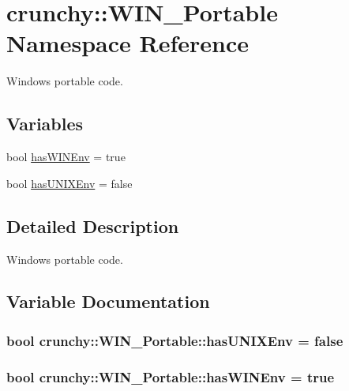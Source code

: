 \hypertarget{namespacecrunchy_1_1_w_i_n___portable}{}\section{crunchy\+:\+:W\+I\+N\+\_\+\+Portable Namespace Reference}
\label{namespacecrunchy_1_1_w_i_n___portable}


Windows portable code.  


\subsection*{Variables}
\begin{DoxyCompactItemize}
\item 
bool \hyperlink{namespacecrunchy_1_1_w_i_n___portable_a13f5917ac7e1b16856ddc1e3fb9ecf77}{has\+W\+I\+N\+Env} = true
\item 
bool \hyperlink{namespacecrunchy_1_1_w_i_n___portable_a7e8302941397585df62313986ab8f50a}{has\+U\+N\+I\+X\+Env} = false
\end{DoxyCompactItemize}


\subsection{Detailed Description}
Windows portable code. 

\subsection{Variable Documentation}
\subsubsection[{has\+U\+N\+I\+X\+Env}]{\setlength{\rightskip}{0pt plus 5cm}bool crunchy\+::\+W\+I\+N\+\_\+\+Portable\+::has\+U\+N\+I\+X\+Env = false}\hypertarget{namespacecrunchy_1_1_w_i_n___portable_a7e8302941397585df62313986ab8f50a}{}\label{namespacecrunchy_1_1_w_i_n___portable_a7e8302941397585df62313986ab8f50a}
\subsubsection[{has\+W\+I\+N\+Env}]{\setlength{\rightskip}{0pt plus 5cm}bool crunchy\+::\+W\+I\+N\+\_\+\+Portable\+::has\+W\+I\+N\+Env = true}\hypertarget{namespacecrunchy_1_1_w_i_n___portable_a13f5917ac7e1b16856ddc1e3fb9ecf77}{}\label{namespacecrunchy_1_1_w_i_n___portable_a13f5917ac7e1b16856ddc1e3fb9ecf77}
